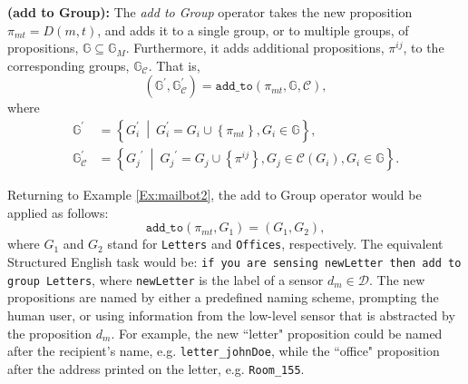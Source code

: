 \begin{myDefinition}\label{Def:addto}
	\textbf{(add to Group):} The \emph{add to Group} operator takes the new proposition $\pi_{mt} = D(m,t)$, and adds it to a single group, or to multiple groups, of propositions, 
	$ \mathbb{G} \subseteq \mathbb{G}_M$.
	Furthermore, it adds additional propositions, $\pi^{ij}$, to the corresponding groups,
	$\mathbb{G}_\mathcal{C}$.
	That is,
	\begin{equation}
		(\mathbb{G}^\prime, \mathbb{G}_{\mathcal{C}}^\prime) = \texttt{add\_to}(\pi_{mt}, \mathbb{G}, \mathcal{C}),
	\end{equation}
	where
	\begin{subequations}
	\begin{align*}
		\mathbb{G}^\prime &= \left\{ G_i^\prime \: \middle| \: G_i^\prime = G_i \cup \left\{ \pi_{mt} \right\}, G_i \in \mathbb{G} \right\},\\
		\mathbb{G}_{\mathcal{C}}^\prime &= \left\{{G_j}^\prime \: \middle| \: {G_j}^\prime = G_j \cup \left\{ \pi^{ij} \right\}, G_j \in \mathcal{C}(G_i), G_i \in \mathbb{G} \right\}.
	\end{align*}
	\end{subequations}
\end{myDefinition}


Returning to Example \ref{Ex:mailbot2}, the add to Group operator would be applied as follows: 
$$ \texttt{add\_to}(\pi_{mt}, G_1) = (G_1, G_2),$$
where $G_1$ and $G_2$ stand for \texttt{Letters} and \texttt{Offices}, respectively.
The equivalent Structured English task would be: \texttt{if you are sensing newLetter then add to group Letters}, where \texttt{newLetter} is the label of a sensor $d_m \in \mathcal{D}$. The new propositions are named by either a predefined naming scheme, prompting the human user, or using information from the low-level sensor that is abstracted by the proposition $d_m$. For example, the new ``letter" proposition could be named after the recipient's name, e.g. \texttt{letter\_johnDoe}, while the ``office" proposition after the address printed on the letter, e.g. \texttt{Room\_155}.

